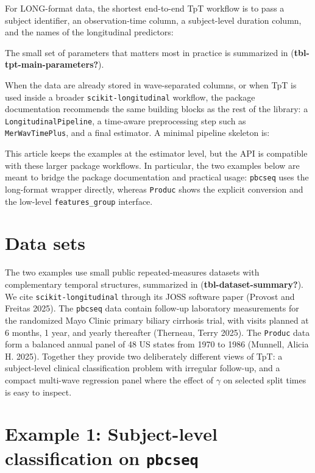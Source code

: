 \documentclass[
]{article}
\begin{document}
For LONG-format data, the shortest end-to-end TpT workflow is to pass a
subject identifier, an observation-time column, a subject-level duration
column, and the names of the longitudinal predictors:

The small set of parameters that matters most in practice is summarized
in (\textbf{tbl-tpt-main-parameters?}).

\label{tbl-tpt-main-parameters}

When the data are already stored in wave-separated columns, or when TpT
is used inside a broader \texttt{scikit-longitudinal} workflow, the
package documentation recommends the same building blocks as the rest of
the library: a \texttt{LongitudinalPipeline}, a time-aware preprocessing
step such as \texttt{MerWavTimePlus}, and a final estimator. A minimal
pipeline skeleton is:

This article keeps the examples at the estimator level, but the API is
compatible with these larger package workflows. In particular, the two
examples below are meant to bridge the package documentation and
practical usage: \texttt{pbcseq} uses the long-format wrapper directly,
whereas \texttt{Produc} shows the explicit conversion and the low-level
\texttt{features\_group} interface.

\section{Data sets}\label{data-sets}

The two examples use small public repeated-measures datasets with
complementary temporal structures, summarized in
(\textbf{tbl-dataset-summary?}). We cite \texttt{scikit-longitudinal}
through its JOSS software paper (Provost and Freitas 2025). The
\texttt{pbcseq} data contain follow-up laboratory measurements for the
randomized Mayo Clinic primary biliary cirrhosis trial, with visits
planned at 6 months, 1 year, and yearly thereafter (Therneau, Terry
2025). The \texttt{Produc} data form a balanced annual panel of 48 US
states from 1970 to 1986 (Munnell, Alicia H. 2025). Together they
provide two deliberately different views of TpT: a subject-level
clinical classification problem with irregular follow-up, and a compact
multi-wave regression panel where the effect of \(\gamma\) on selected
split times is easy to inspect.

\label{tbl-dataset-summary}

\section{\texorpdfstring{Example 1: Subject-level classification on
\texttt{pbcseq}}{Example 1: Subject-level classification on pbcseq}}\label{example-1-subject-level-classification-on-pbcseq}
\end{document}
